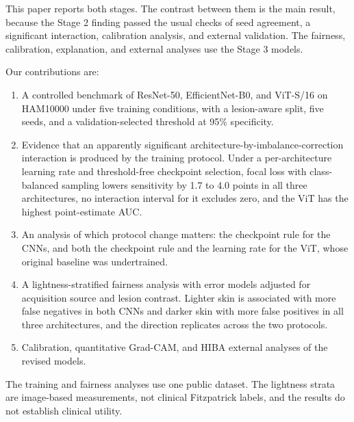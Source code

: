 This paper reports both stages. The contrast between them is the main result, because the Stage 2 finding passed the usual checks of seed agreement, a significant interaction, calibration analysis, and external validation. The fairness, calibration, explanation, and external analyses use the Stage 3 models.

Our contributions are:

\begin{enumerate}
  \item A controlled benchmark of ResNet-50, EfficientNet-B0, and ViT-S/16 on HAM10000 under five training conditions, with a lesion-aware split, five seeds, and a validation-selected threshold at 95\% specificity.
  \item Evidence that an apparently significant architecture-by-imbalance-correction interaction is produced by the training protocol. Under a per-architecture learning rate and threshold-free checkpoint selection, focal loss with class-balanced sampling lowers sensitivity by 1.7 to 4.0 points in all three architectures, no interaction interval for it excludes zero, and the ViT has the highest point-estimate AUC.
  \item An analysis of which protocol change matters: the checkpoint rule for the CNNs, and both the checkpoint rule and the learning rate for the ViT, whose original baseline was undertrained.
  \item A lightness-stratified fairness analysis with error models adjusted for acquisition source and lesion contrast. Lighter skin is associated with more false negatives in both CNNs and darker skin with more false positives in all three architectures, and the direction replicates across the two protocols.
  \item Calibration, quantitative Grad-CAM, and HIBA external analyses of the revised models.
\end{enumerate}

The training and fairness analyses use one public dataset. The lightness strata are image-based measurements, not clinical Fitzpatrick labels, and the results do not establish clinical utility.
